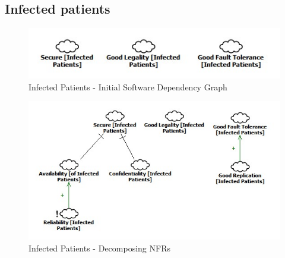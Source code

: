 \documentclass{VUMIFPSkursinis}
\begin{document}
\begin{landscape}
	\subsection{Infected patients}
		\begin{figure}[H]
			\center
			\includegraphics[scale=0.9]{StarUML/Infected-Patients-1}
			\caption{Infected Patients - Initial Software Dependency Graph} %
			\label{img:kurimoProcesas}
		\end{figure}
		\begin{figure}[H]
			\center
			\includegraphics[scale=0.9]{StarUML/Infected-Patients-2}
			\caption{Infected Patients - Decomposing NFRs} %
			\label{img:kurimoProcesas}
		\end{figure}




\end{landscape}
\end{document}
